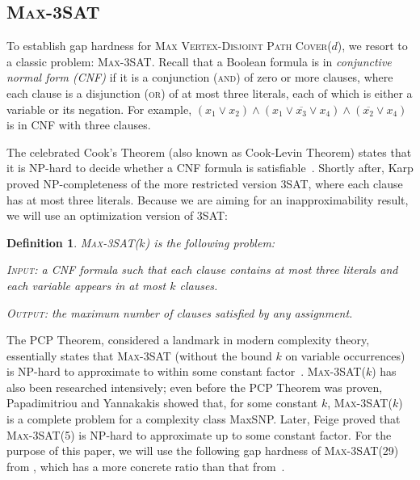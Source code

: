 \documentclass[11pt]{article}
\newtheorem{definition}{Definition}
\begin{document}
\subsection{\textsc{Max-3SAT}}

To establish gap hardness for \textsc{Max Vertex-Disjoint Path Cover($d$)}, we resort to a classic problem: \textsc{Max-3SAT}.
Recall that a Boolean formula is in \emph{conjunctive normal form (CNF)} if it is a conjunction (\textsc{and}) of zero or more clauses, where each clause is a disjunction (\textsc{or}) of at most three literals, each of which is either a variable or its negation. For example, $(x_1 \vee x_2) \wedge (x_1 \vee \overline{x_3} \vee x_4) \wedge (\overline{x_2} \vee x_4)$ is in CNF with three clauses.

The celebrated Cook's Theorem (also known as Cook-Levin Theorem) states that it is NP-hard to decide whether a CNF formula is satisfiable~\cite{Cook71}. Shortly after, Karp \cite{Karp72} proved NP-completeness of the more restricted version \textsc{3SAT}, where each clause has at most three literals. Because we are aiming for an inapproximability result, we will use an optimization version of \textsc{3SAT}:

\begin{definition}
	\textsc{Max-3SAT($k$)} is the following problem:

	\textsc{Input:} a CNF formula such that each clause contains at most three literals and each variable appears in at most $k$ clauses.

	\textsc{Output:} the maximum number of clauses satisfied by any assignment.
\end{definition}

The PCP Theorem, considered a landmark in modern complexity theory, essentially states that \textsc{Max-3SAT} (without the bound $k$ on variable occurrences) is NP-hard to approximate to within some constant factor~\cite{ALMSS98,AS98}. \textsc{Max-3SAT($k$)} has also been researched intensively; even before the PCP Theorem was proven, Papadimitriou and Yannakakis \cite{PY88} showed that, for some constant $k$, \textsc{Max-3SAT($k$)} is a complete problem for a complexity class MaxSNP. Later, Feige \cite{Feige98} proved that \textsc{Max-3SAT(5)} is NP-hard to approximate up to some constant factor. For the purpose of this paper, we will use the following gap hardness of \textsc{Max-3SAT(29)} from \cite[pp.~314]{Vazirani01}, which has a more concrete ratio than that from~\cite{Feige98}.
\end{document}
